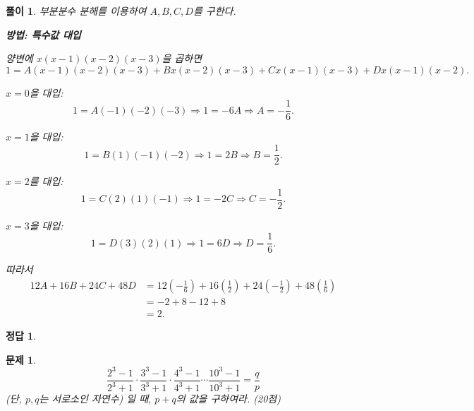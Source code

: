 \documentclass[12pt,a4paper]{article}
\theoremstyle{test_form}
\newtheorem{problem}{문제}[section]
\newtheorem*{solution}{풀이}
\newtheorem*{answer}{정답}
\begin{document}
\begin{solution}

\setlength{\parindent}{0pt}

부분분수 분해를 이용하여 \(A, B, C, D\)를 구한다.

\textbf{방법: 특수값 대입}

양변에 \(x(x-1)(x-2)(x-3)\)을 곱하면
\[
1 = A(x-1)(x-2)(x-3) + Bx(x-2)(x-3) + Cx(x-1)(x-3) + Dx(x-1)(x-2).
\]

\(x=0\)을 대입:
\[
1 = A(-1)(-2)(-3) \Rightarrow 1 = -6A \Rightarrow A = -\frac{1}{6}.
\]

\(x=1\)을 대입:
\[
1 = B(1)(-1)(-2) \Rightarrow 1 = 2B \Rightarrow B = \frac{1}{2}.
\]

\(x=2\)를 대입:
\[
1 = C(2)(1)(-1) \Rightarrow 1 = -2C \Rightarrow C = -\frac{1}{2}.
\]

\(x=3\)을 대입:
\[
1 = D(3)(2)(1) \Rightarrow 1 = 6D \Rightarrow D = \frac{1}{6}.
\]

따라서
\[
\begin{aligned}
12A + 16B + 24C + 48D &= 12\left(-\frac{1}{6}\right) + 16\left(\frac{1}{2}\right) + 24\left(-\frac{1}{2}\right) + 48\left(\frac{1}{6}\right)\\
&= -2 + 8 - 12 + 8\\
&= 2.
\end{aligned}
\]

\end{solution}

\begin{answer}
\hfill {}
\end{answer}

\newpage

\begin{problem}

\[
\frac{2^3-1}{2^3+1}\cdot\frac{3^3-1}{3^3+1}\cdot\frac{4^3-1}{4^3+1}\cdots\frac{10^3-1}{10^3+1}=\frac{q}{p}
\]
(단, \(p,q\)는 서로소인 자연수) 일 때, \(p+q\)의 값을 구하여라. (20점)

\begin{flushright}\end{flushright}

\end{problem}
\end{document}
